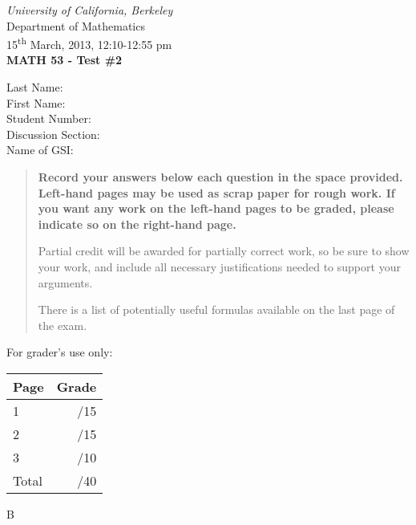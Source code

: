 \documentclass[12pt]{article}
\newcommand{\skipline}{\vspace{12pt}}
\begin{document}
\author{Instructor: Sean Fitzpatrick}
\thispagestyle{plain}
\begin{center}
\emph{University of California, Berkeley}\\
Department of Mathematics\\
15\textsuperscript{th} March, 2013, 12:10-12:55 pm\\
{\bf MATH 53 - Test \#2}\\
\end{center}
\skipline \skipline \skipline \noindent \skipline
Last Name:\underline{\hspace{350pt}}\\
\skipline
First Name:\underline{\hspace{348pt}}\\
\skipline
Student Number:\underline{\hspace{322pt}}\\
\skipline
Discussion Section: \underline{\hspace{307pt}}\\
\skipline
Name of GSI: \underline{\hspace{336pt}}\\

\vspace{0.5in}


\begin{quote}
 {\bf Record your answers below each question in the space provided.    Left-hand pages may be used as scrap paper for rough work.  If you want any work on the left-hand pages to be graded, please indicate so on the right-hand page.
 
 \bigskip
 
Partial credit will be awarded for partially correct work, so be sure to show your work, and include all necessary justifications needed to support your arguments. 

There is a list of potentially useful formulas available on the last page of the exam.}
\end{quote}


\vspace{0.5in}

For grader's use only:

\begin{table}[hbt]
\begin{center}
\begin{tabular}{|l|r|} \hline
Page&Grade\\
\hline \hline
\cline{1-2} 1 & \enspace\enspace\enspace\enspace\enspace\enspace/15\\
\cline{1-2} 2 & \enspace\enspace\enspace\enspace\enspace\enspace/15\\
\cline{1-2} 3 & \enspace\enspace\enspace\enspace\enspace\enspace/10\\
\cline{1-2} Total & \enspace\enspace\enspace\enspace\enspace\enspace/40\\
\hline
\end{tabular}

\skipline

\skipline

\skipline

B
\end{center}
\end{table}
\newpage
\end{document}
